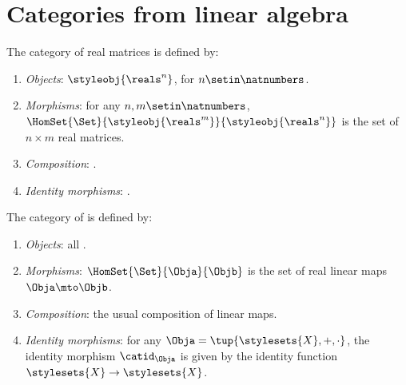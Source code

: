 
\section[Categories from linear algebra]{Categories from linear algebra}
\label{sec:cats-of-linear-algebra}

\begin{ctdefinition}
    \label{def:cat-of-real-matrices}
    The category \MatR of real matrices is defined by:
    \begin{enumerate}
        \item \emph{Objects}: $\styleobj{\reals^n}$, for $n \setin \natnumbers$.
        \item \emph{Morphisms}: for any $n, m \setin \natnumbers$, $\HomSet{\Set}{\styleobj{\reals^m}}{\styleobj{\reals^n}}$ is the set  of $n \times m$ real matrices.
        \item \emph{Composition}: .
        \item \emph{Identity morphisms}: .
    \end{enumerate}
\end{ctdefinition}

\begin{ctdefinition}
    \label{def:cat-of-real-vector-spaces}
    The category \VectR of  is defined by:
    \begin{enumerate}
        \item \emph{Objects}: all .
        \item \emph{Morphisms}: $\HomSet{\Set}{\Obja}{\Objb}$ is the set of real linear maps $\Obja \mto \Objb$.
        \item \emph{Composition}: the usual composition of linear maps.
        \item \emph{Identity morphisms}: for any  $\Obja = \tup{\stylesets{X}, {{+}},{{ \cdot}}}$, the identity morphism $\catid_\Obja$ is given by the identity function $\stylesets{X} \to \stylesets{X}$.
    \end{enumerate}
\end{ctdefinition}

